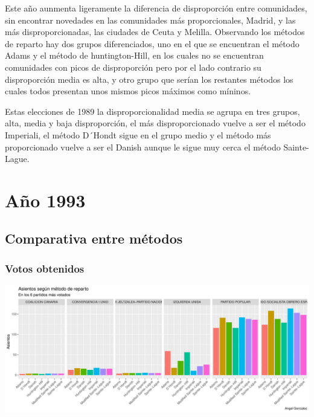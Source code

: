 \documentclass[12pt,a4paper,]{book}
\numberwithin{dummy}{section}
\theoremstyle{ocrenumbox}
\theoremstyle{blacknumex}
\theoremstyle{blacknumbox}
\theoremstyle{ocrenum}
\theoremstyle{ocrenum}
\begin{document}
Este año aunmenta ligeramente la diferencia de disproporción entre
comunidades, sin encontrar novedades en las comunidades más
proporcionales, Madrid, y las más disproporcionadas, las ciudades de
Ceuta y Melilla. Observando los métodos de reparto hay dos grupos
diferenciados, uno en el que se encuentran el método Adams y el método
de huntington-Hill, en los cuales no se encuentran comunidades con picos
de disproporción pero por el lado contrario su disproporción media es
alta, y otro grupo que serían los restantes métodos los cuales todos
presentan unos mismos picos máximos como míninos.

Estas elecciones de 1989 la disproporcionalidad media se agrupa en tres
grupos, alta, media y baja disproporción, el más disproporcionado vuelve
a ser el método Imperiali, el método D´Hondt sigue en el grupo medio y
el método más proporcionado vuelve a ser el Danish aunque le sigue muy
cerca el método Sainte-Lague.

\hypertarget{auxf1o-1993}{%
\section{Año 1993}\label{auxf1o-1993}}

\hypertarget{comparativa-entre-muxe9todos-5}{%
\subsection{Comparativa entre
métodos}\label{comparativa-entre-muxe9todos-5}}

\hypertarget{votos-obtenidos-5}{%
\subsubsection{Votos obtenidos}\label{votos-obtenidos-5}}

\begin{center}\includegraphics[width=0.95\linewidth]{figurasR/unnamed-chunk-104-1} \end{center}
\end{document}
